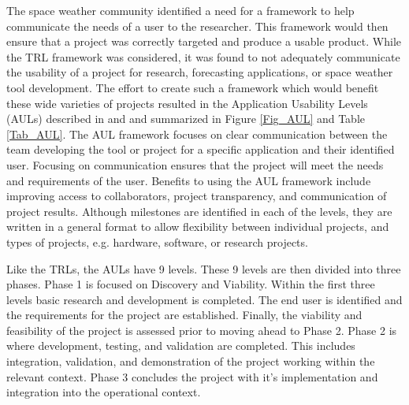 \documentclass[referee,a4paper,12pt,traditabstract]{swsc}
\begin{document}
\begin{linenumbers}
The space weather community identified a need for a framework to help communicate the needs of a user to the researcher. This framework would then ensure that a project was correctly targeted and produce a usable product. While the TRL framework was considered, it was found to not adequately communicate the usability of a project for research, forecasting applications, or space weather tool development. The effort to create such a framework which would benefit these wide varieties of projects resulted in the Application Usability Levels (AULs) described in \citet{halford19} and \citet{cid2020} and  summarized in Figure \ref{Fig_AUL} and Table \ref{Tab_AUL}. The AUL framework focuses on clear communication between the team developing the tool or project for a specific application and their identified user. Focusing on communication ensures that the project will meet the needs and requirements of the user. Benefits to using the AUL framework include improving access to collaborators, project transparency, and communication of project results. Although milestones are identified in each of the levels, they are written in a general format to allow flexibility between individual projects, and types of projects, e.g. hardware, software, or research projects. 
   
Like the TRLs, the AULs have 9 levels. These 9 levels are then divided into three phases. Phase 1 is focused on Discovery and Viability. Within the first three levels basic research and development is completed. The end user is identified and the requirements for the project are established. Finally, the viability and feasibility of the project is assessed prior to moving ahead to Phase 2. Phase 2 is where development, testing, and validation are completed. This includes integration, validation, and demonstration of the project working within the relevant context. Phase 3 concludes the project with it's implementation and integration into the operational context.  


\end{linenumbers}
\end{document}
